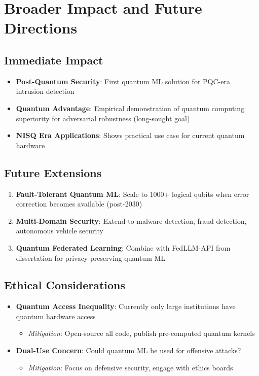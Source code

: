 \documentclass[11pt]{article}
\begin{document}
\section{Broader Impact and Future Directions}

\subsection{Immediate Impact}

\begin{itemize}
    \item \textbf{Post-Quantum Security}: First quantum ML solution for PQC-era intrusion detection
    \item \textbf{Quantum Advantage}: Empirical demonstration of quantum computing superiority for adversarial robustness (long-sought goal)
    \item \textbf{NISQ Era Applications}: Shows practical use case for current quantum hardware
\end{itemize}

\subsection{Future Extensions}

\begin{enumerate}
    \item \textbf{Fault-Tolerant Quantum ML}: Scale to 1000+ logical qubits when error correction becomes available (post-2030)
    \item \textbf{Multi-Domain Security}: Extend to malware detection, fraud detection, autonomous vehicle security
    \item \textbf{Quantum Federated Learning}: Combine with FedLLM-API from dissertation for privacy-preserving quantum ML
\end{enumerate}

\subsection{Ethical Considerations}

\begin{itemize}
    \item \textbf{Quantum Access Inequality}: Currently only large institutions have quantum hardware access
    \begin{itemize}
        \item \textit{Mitigation}: Open-source all code, publish pre-computed quantum kernels
    \end{itemize}
    \item \textbf{Dual-Use Concern}: Could quantum ML be used for offensive attacks?
    \begin{itemize}
        \item \textit{Mitigation}: Focus on defensive security, engage with ethics boards
    \end{itemize}
\end{itemize}
\end{document}
